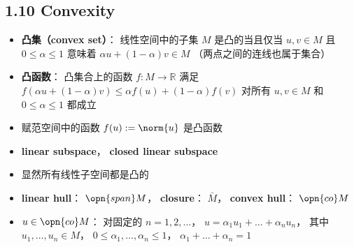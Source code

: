 \subsection{1.10 Convexity}
\begin{itemize}
\item \textbf{凸集（convex set）}： 线性空间中的子集 $M$ 是凸的当且仅当 $u, v\in M$ 且 $0\le\alpha\le1$ 意味着 $\alpha u+(1-\alpha)v\in M$ （两点之间的连线也属于集合）

\item \textbf{凸函数}： 凸集合上的函数 $f:M\to\mathbb R$ 满足 $f(\alpha u + (1-\alpha)v) \le \alpha f(u)+(1-\alpha)f(v)$ 对所有 $u, v\in M$ 和 $0\le\alpha\le1$ 都成立

\item 赋范空间中的函数 $f(u) := \norm{u}$ 是凸函数

\item \textbf{linear subspace}， \textbf{closed linear subspace}

\item 显然所有线性子空间都是凸的

\item \textbf{linear hull}： $\opn{span} M$， \textbf{closure}： $\bar M$， \textbf{convex hull}： $\opn{co} M$

\item $u \in \opn{co} M$： 对固定的 $n = 1, 2,\dots$， $u = \alpha_1u_1 + \dots + \alpha_n u_n$， 其中 $u_1,\dots,u_n\in M$， $0\le\alpha_1,\dots,\alpha_n\le1$， $\alpha_1+\dots+\alpha_n = 1$
\end{itemize}


